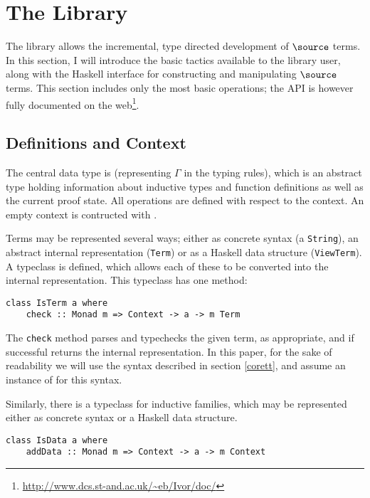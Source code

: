 \section{The \Ivor{} Library}


The \Ivor{} library allows the incremental, type directed development
of $\source$ terms.  In this section, I will introduce the basic
tactics available to the library user, along with the Haskell
interface for constructing and manipulating $\source$ terms. This
section includes only the most basic operations; the API is however
fully documented on the
web\footnote{\url{http://www.dcs.st-and.ac.uk/~eb/Ivor/doc/}}.

\subsection{Definitions and Context}

The central data type is  (representing $\Gamma$ in the
typing rules), which is an abstract type holding information about
inductive types and function definitions as well as the current proof
state. All operations are defined with respect to the context. An
empty context is contructed with .

Terms may be represented several ways; either as concrete syntax (a
\texttt{String}), an abstract internal representation (\texttt{Term})
or as a Haskell data structure (\texttt{ViewTerm}). A typeclass
 is defined, which allows each of these to be converted
into the internal representation. This typeclass has one method:

\verb+class IsTerm a where+\\
\verb+    check :: Monad m => Context -> a -> m Term+

The \texttt{check} method parses and typechecks the given term, as
appropriate, and if successful returns the internal representation. In
this paper, for the sake of readability we will use the syntax
described in section \ref{corett}, and assume an instance of
 for this syntax.

Similarly, there is a typeclass for inductive families,
which may be represented either as concrete syntax or a Haskell data
structure.

\verb+class IsData a where+\\
\verb+    addData :: Monad m => Context -> a -> m Context+

